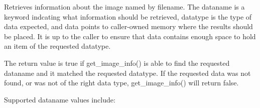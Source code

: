 Retrieves information about the image named by {\cf filename}.
The {\cf dataname} is a keyword indcating what information should
be retrieved, {\cf datatype} is the type of data expected, and
{\cf data} points to caller-owned memory where the results should be
placed.  It is up to the caller to ensure that {\cf data} contains
enough space to hold an item of the requested {\cf datatype}.

The return value is {\cf true} if {\cf get_image_info()} is able
to find the requested {\cf dataname} and it matched the requested
{\cf datatype}.  If the requested data was not found, or was not
of the right data type, {\cf get_image_info()} will return {\cf false}.

Supported {\cf dataname} values include:

